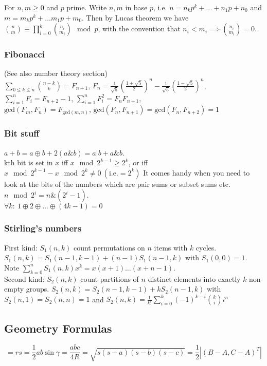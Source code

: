 \documentclass[
	a4paper,
	landscape,
	10pt,
]{article}
\begin{document}
		For $n, m \geq 0$ and $p$ prime. Write $n, m$ in base $p$, i.e.
		$n = n_k p^k + \dots + n_1 p + n_0$ and $m = m_k p^k + \dots m_1 p + m_0$. Then
		by Lucas theorem we have $\binom{n}{m} \equiv \prod_{i=0}^k \binom{n_i}{m_i}
		\mod p$, with the convention that $n_i < m_i \implies \binom{n_i}{m_i} =0$.

		\subsubsection*{Fibonacci} (See also number theory section) \\
 		$\sum_{0 \leq k \leq n} \binom{n-k}{k} = F_{n+1}$, 
		$F_n = \frac{1}{\sqrt{5}} \left(\frac{1+\sqrt{5}}{2}\right)^n - \frac{1}{\sqrt{5}}\left(\frac{1-\sqrt{5}}{2}\right)^n$, \\
		$\sum_{i=1}^{n} {F_i} = F_{n+2}-1$, $\sum_{i=1}^{n} {F_i^2} = F_{n}F_{n+1}$, \\
		$\text{gcd}(F_m, F_n) = F_{\text{gcd}(m, n)}$,
		$\text{gcd}(F_n, F_{n+1}) = \text{gcd}(F_n, F_{n+2}) = 1$

		\subsubsection*{Bit stuff} $a + b = a \oplus b + 2(a\&b) = a | b + a\&b$. \\
		kth bit is set in $x$ iff $x \mod 2^{k-1} \geq 2^k$, or iff $x \mod 2^{k-1}  - x \mod 2^k \neq 0~(\text{i.e.} = 2^k)$ It comes handy when you need to look at the bits of the numbers which are pair sums or subset sums etc. \\
		$n \mod 2^i = n\&(2^i-1)$. \\
		$\forall k:~ 1 \oplus 2 \oplus \hdots \oplus (4k-1) = 0$

		\subsubsection*{Stirling's numbers} First kind: $S_1(n, k)$ count permutations on $n$ items
		with $k$ cycles. $S_1(n, k) = S_1(n-1, k-1) + (n-1)S_1(n-1, k)$ with
		$S_1(0, 0) = 1$. Note $\sum_{k=0}^n S_1(n, k)x^k = x(x+1)\dots(x+n-1)$.\\
		Second kind: $S_2(n, k)$ count partitions of $n$
		distinct elements into exactly $k$ non-empty groups.
		$S_2(n, k) = S_2(n-1, k-1) + kS_2(n-1, k)$ with $S_2(n, 1) = S_2(n, n) = 1$ and
		$S_2(n, k) = \frac{1}{k!}\sum_{i=0}^k (-1)^{k-i}\binom{k}{i}i^n$

		\subsection{Geometry Formulas}
		\begin{equation*}
			[ABC]
			= rs
			= \frac 12 ab\sin\gamma
			= \frac{abc}{4R}
			= \sqrt{s(s-a)(s-b)(s-c)}
			= \frac 12\left| (B-A, C-A)^T \right|
		\end{equation*}
\end{document}
